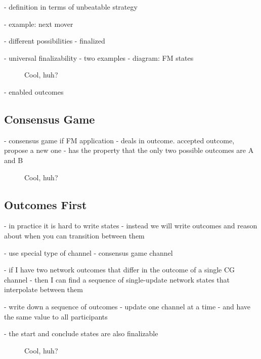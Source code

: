- definition in terms of unbeatable strategy

- example: next mover

- different possibilities
  - finalized

- universal finalizability
- two examples
- diagram: FM states
\begin{figure}[h]\centering
  \makebox[\textwidth][c]{}
  \caption{Cool, huh?}
\end{figure}

- enabled outcomes

\subsection{Consensus Game}

- consensus game if FM application
- deals in outcome. accepted outcome, propose a new one
- has the property that the only two possible outcomes are A and B
\begin{figure}[h]\centering
  \makebox[\textwidth][c]{}
  \caption{Cool, huh?}
\end{figure}

\subsection{Outcomes First}

- in practice it is hard to write states
- instead we will write outcomes and reason about when you can transition between them

- use special type of channel - consensus game channel


- if I have two network outcomes that differ in the outcome of a single CG channel
- then I can find a sequence of single-update network states that interpolate between them

- write down a sequence of outcomes
- update one channel at a time
- and have the same value to all participants

- the start and conclude states are also finalizable

\begin{figure}[h]\centering
  \makebox[\textwidth][c]{}
  \caption{Cool, huh?}
\end{figure}
